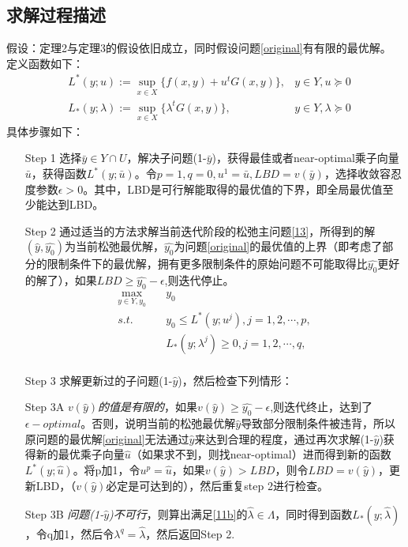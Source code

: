 \documentclass[UTF8,a4]{article}
\begin{document}
\subsection{求解过程描述}
假设：定理2与定理3的假设依旧成立，同时假设问题\eqref{original}有有限的最优解。
定义函数如下：
\begin{subequations}
\begin{align}
\label{12a}
&L^*(y;u):=\sup_{x\in X}\{f(x,y)+u^tG(x,y)\},&y\in Y,u\succeq 0\\
\label{12b}
&L_*(y;\lambda):=\sup_{x\in X}\{\lambda^tG(x,y)\},&y\in Y,\lambda\succeq0
\end{align}
\end{subequations}
具体步骤如下：
\begin{itemize}
\item[Step 1]选择$\bar{y}\in Y\cap U $，解决子问题(1-$\bar{y}$)，获得最佳或者near-optimal乘子向量$\bar{u}$，获得函数$L^*(y;\bar{u})$。令$p=1,q=0,u^1=\bar{u},LBD=v(\bar{y})$，选择收敛容忍度参数$\epsilon>0$。其中，LBD是可行解能取得的最优值的下界，即全局最优值至少能达到LBD。
\item[Step 2]通过适当的方法求解当前迭代阶段的松弛主问题\eqref{13}，所得到的解$(\hat{y},\hat{y_0})$为当前松弛最优解，$\hat{y_0}$为问题\eqref{original}的最优值的上界（即考虑了部分的限制条件下的最优解，拥有更多限制条件的原始问题不可能取得比$\hat{y_0}$更好的解了），如果$LBD\geqslant\hat{y_0}-\epsilon$,则迭代停止。
\begin{equation}
\label{13}
\begin{split}
\max_{y\in Y,y_0}\quad&y_0\\
s.t.\quad&y_0\leqslant L^*(y;u^j), j=1,2,\cdots,p,\\
&L_*(y;\lambda^j)\geqslant 0, j=1,2,\cdots,q,\\
\end{split}
\end{equation}
\item[Step 3]求解更新过的子问题(1-$\hat{y}$)，然后检查下列情形：
\item[Step 3A]\emph{$v(\hat{y})$的值是有限的}，如果$v(\hat{y}) \geqslant \hat{y_0} - \epsilon$,则迭代终止，达到了$\epsilon-optimal$。否则，说明当前的松弛最优解$\hat{y}$导致部分限制条件被违背，所以原问题的最优解\eqref{original}无法通过$\hat{y}$来达到合理的程度，通过再次求解(1-$\hat{y}$)获得新的最优乘子向量$\hat{u}$（如果求不到，则找near-optimal）进而得到新的函数$L^*(y;\hat{u})$。将p加1，令$u^p=\hat{u}$，如果$v(\hat{y})>LBD$，则令$LBD=v(\hat{y})$，更新LBD，（$v(\hat{y})$必定是可达到的），然后重复step 2进行检查。
\item[Step 3B]\emph{问题(1-$\hat{y}$)不可行}，则算出满足\eqref{11b}的$\hat{\lambda}\in\Lambda$，同时得到函数$L_*(y;\hat{\lambda})$，令q加1，然后令$\lambda^q=\hat{\lambda}$，然后返回Step 2.
\end{itemize}
\end{document}
